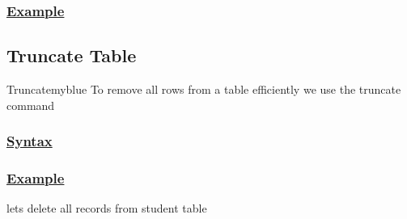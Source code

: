 

\subsubsection*{\underline{Example}}
\subsection{Truncate Table}
\begin{prettyBox}{Truncate}{myblue}
    To remove all rows from a table efficiently we use the truncate command
\end{prettyBox}

\subsubsection*{\underline{Syntax}}




\subsubsection*{\underline{Example}}
lets delete all records from student table



